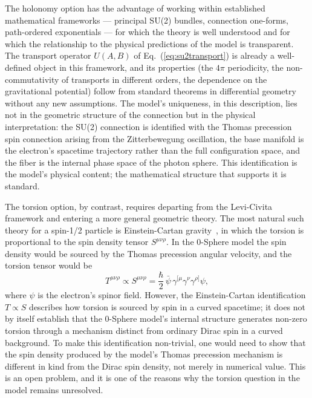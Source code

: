 \documentclass[%
 reprint,
 amsmath,amssymb,
 aps,
 prb,
]{revtex4-2}
\numberwithin{equation}{section}
\newcommand{\UAB}{U(A,B)}
\begin{document}
The holonomy option has the advantage of working within established mathematical frameworks --- principal SU(2) bundles, connection one-forms, path-ordered exponentials --- for which the theory is well understood and for which the relationship to the physical predictions of the model is transparent. The transport operator $\UAB$ of Eq.~(\ref{eq:su2transport}) is already a well-defined object in this framework, and its properties (the $4\pi$ periodicity, the non-commutativity of transports in different orders, the dependence on the gravitational potential) follow from standard theorems in differential geometry without any new assumptions. The model's uniqueness, in this description, lies not in the geometric structure of the connection but in the physical interpretation: the SU(2) connection is identified with the Thomas precession spin connection arising from the Zitterbewegung oscillation, the base manifold is the electron's spacetime trajectory rather than the full configuration space, and the fiber is the internal phase space of the photon sphere. This identification is the model's physical content; the mathematical structure that supports it is standard.

The torsion option, by contrast, requires departing from the Levi-Civita framework and entering a more general geometric theory. The most natural such theory for a spin-1/2 particle is Einstein-Cartan gravity~\cite{hehl1976,mtw}, in which the torsion is proportional to the spin density tensor $S^{\mu\nu\rho}$. In the 0-Sphere model the spin density would be sourced by the Thomas precession angular velocity, and the torsion tensor would be
\begin{equation}
T^{\mu\nu\rho} \propto S^{\mu\nu\rho} = \frac{\hbar}{2}\, \bar{\psi}\,\gamma^{[\mu}\gamma^\nu\gamma^{\rho]}\psi,
\label{eq:einstein_cartan}
\end{equation}
where $\psi$ is the electron's spinor field. However, the Einstein-Cartan identification $T \propto S$ describes how torsion is sourced by spin in a curved spacetime; it does not by itself establish that the 0-Sphere model's internal structure generates non-zero torsion through a mechanism distinct from ordinary Dirac spin in a curved background. To make this identification non-trivial, one would need to show that the spin density produced by the model's Thomas precession mechanism is different in kind from the Dirac spin density, not merely in numerical value. This is an open problem, and it is one of the reasons why the torsion question in the model remains unresolved.
\end{document}
